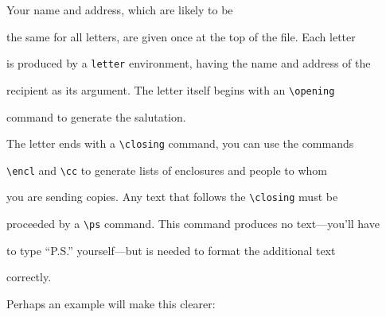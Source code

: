 Your name and address, which are likely to be

the same for all letters, are given once at the top of the file.  Each letter

is produced by a {\tt letter} environment, having the name and address of the

recipient as its argument.  The letter itself begins with an \verb|\opening|

command to generate the salutation.



The letter ends with a \verb|\closing| command, you can use the commands

\verb|\encl| and \verb|\cc| to generate lists of enclosures and people to whom

you are sending copies. Any text that follows the \verb|\closing| must be

proceeded by a \verb|\ps| command.  This command produces no text---you'll have

to type ``P.S.'' yourself---but is needed to format the additional text

correctly.



Perhaps an example will make this clearer:

